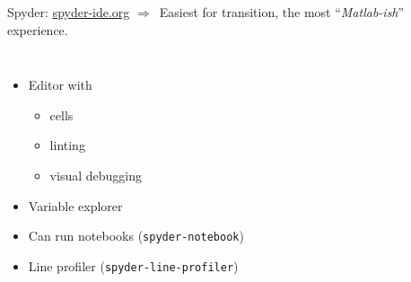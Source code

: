 \documentclass[usepdftitle=false, aspectratio=169]{beamer}
\newcommand{\dra}{\ensuremath{\Rightarrow }~}
\newcommand{\code}[1]{\texttt{\color{mygreen}#1}}
\begin{document}
\begin{frame}
  {Spyder: \href{https://www.spyder-ide.org}{spyder-ide.org}}
  \dra Easiest for transition, the most “\emph{Matlab-ish}” experience.
  \vspace{1em}

  \begin{columns}

  \begin{itemize}
    \item Editor with
      \begin{itemize}
        \item cells
        \item linting
        \item visual debugging
      \end{itemize}
    \item Variable explorer
    \item Can run notebooks (\code{spyder-notebook})
    \item Line profiler (\code{spyder-line-profiler})
  \end{itemize}



  \end{columns}
\end{frame}
\end{document}
